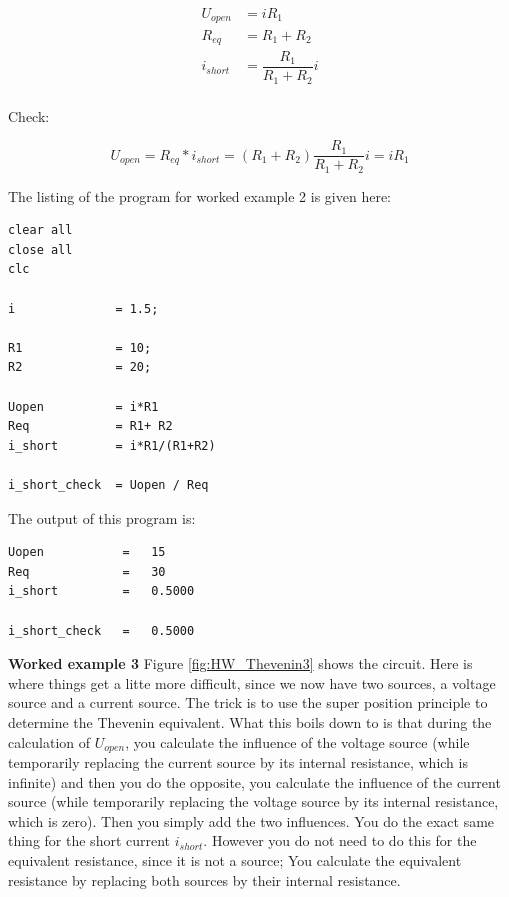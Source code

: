 \documentclass[11pt,letterpaper]{article}
\begin{document}
\begin{align}\label{Eqn:HW_Thevenin2}
U_{open} &= i R_1 \\
R_{eq}  &= R_1 + R_2 \\
i_{short} &=  \dfrac{R_1}{R_1+R_2} i\\
\end{align}

Check:

\begin{equation}
U_{open} = R_{eq} * i_{short} = \left( R_1 + R_2\right)  \dfrac{R_1}{R_1+R_2} i = i R_1
\end{equation}

\newpage
The listing of the program for worked example 2 is given here:

\begin{lstlisting}
clear all
close all
clc

i              = 1.5;

R1             = 10;
R2             = 20;

Uopen          = i*R1
Req            = R1+ R2
i_short        = i*R1/(R1+R2)

i_short_check  = Uopen / Req
\end{lstlisting}

The output of this program is:

\begin{lstlisting}
Uopen 			=   15
Req 			=   30
i_short 		=   0.5000

i_short_check 	=   0.5000
\end{lstlisting}

\newpage

\textbf{Worked example 3}
Figure \ref{fig:HW_Thevenin3} shows the circuit. Here is where things get a litte more difficult, since we now have two sources, a voltage source and a current source. The trick is to use the super position principle to determine the Thevenin equivalent. What this boils down to is that during the calculation of $U_{open}$, you calculate the influence of the voltage source (while temporarily replacing the current source by its internal resistance, which is infinite) and then you do the opposite, you calculate the influence of the current source (while temporarily replacing the voltage source by its internal resistance, which is zero). Then you simply add the two influences. You do the exact same thing for the short current $i_{short}$. However you do not need to do this for the equivalent resistance, since it is not a source; You calculate the equivalent resistance by replacing both sources by their internal resistance.\\
\end{document}
